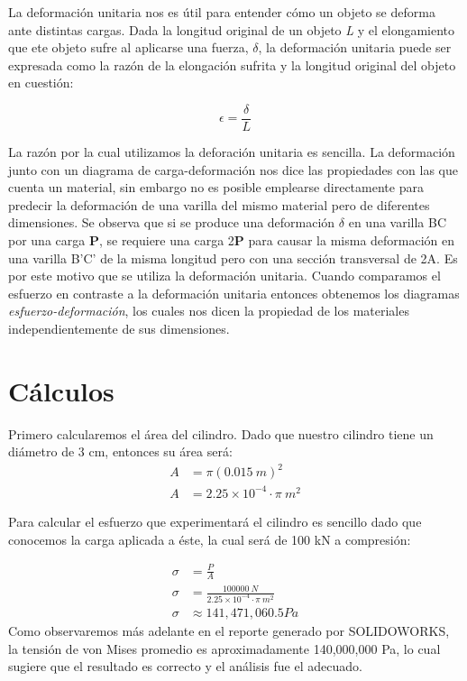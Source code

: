 \documentclass[12pt, letterpaper]{article}
\begin{document}
La deformación unitaria nos es útil para entender cómo un objeto se deforma ante distintas cargas. Dada la longitud original de un objeto \textit{L} y el elongamiento que ete objeto sufre al aplicarse una fuerza, $\delta$, la deformación unitaria puede ser expresada como la razón de la elongación sufrita y la longitud original del objeto en cuestión\autocite{MM}:

\begin{equation}
	\epsilon = \frac{\delta}{L}
\end{equation}

La razón por la cual utilizamos la deforación unitaria es sencilla. La deformación junto con un diagrama de carga-deformación nos dice las propiedades con las que cuenta un material, sin embargo no es posible emplearse directamente para predecir la deformación de una varilla del mismo material pero de diferentes dimensiones. Se observa que si se produce una deformación $\delta$ en una varilla BC por una carga \textbf{P}, se requiere una carga 2\textbf{P} para causar la misma deformación en una varilla B'C' de la misma longitud pero con una sección transversal de 2A. Es por este motivo que se utiliza la deformación unitaria. Cuando comparamos el esfuerzo en contraste a la deformación unitaria entonces obtenemos los diagramas \textit{esfuerzo-deformación}, los cuales nos dicen la propiedad de los materiales independientemente de sus dimensiones.

\section*{Cálculos}

Primero calcularemos el área del cilindro. Dado que nuestro cilindro tiene un diámetro de 3 cm, entonces su área será:
\begin{equation*}
\begin{split}
	A &= \pi(0.015\  m)^2 \\
	A &= 2.25 \times 10^{-4}\cdot \pi \ m^2
\end{split}
\end{equation*}

Para calcular el esfuerzo que experimentará el cilindro es sencillo dado que conocemos la carga aplicada a éste, la cual será de 100 kN a compresión:

\begin{equation}
	\begin{split}
	\sigma &= \frac{P}{A}\\
	\sigma &= \frac{100000\ N}{2.25 \times 10^{-4}\cdot \pi \ m^2}\\
	\sigma &\approx 141,471,060.5 Pa
	\end{split}
\end{equation}
Como observaremos más adelante en el reporte generado por SOLIDOWORKS, la tensión de von Mises promedio es aproximadamente 140,000,000 Pa, lo cual sugiere que el resultado es correcto y el análisis fue el adecuado.
\end{document}
